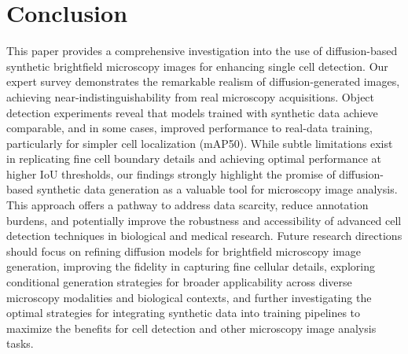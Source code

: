\section{Conclusion}
\label{sec:conclusion}
This paper provides a comprehensive investigation into the use of diffusion-based synthetic brightfield microscopy images for enhancing single cell detection.
Our expert survey demonstrates the remarkable realism of diffusion-generated images, achieving near-indistinguishability from real microscopy acquisitions.
Object detection experiments reveal that models trained with synthetic data achieve comparable, and in some cases, improved performance to real-data training, particularly for simpler cell localization (mAP\@50).
While subtle limitations exist in  replicating fine cell boundary details and achieving optimal performance at higher IoU thresholds, our findings strongly highlight the promise of diffusion-based synthetic data generation as a valuable tool for microscopy image analysis.
This approach offers a pathway to address data scarcity, reduce annotation burdens, and potentially improve the robustness and accessibility of advanced cell detection techniques in biological and medical research.
Future research directions should focus on refining diffusion models for brightfield microscopy image generation, improving the fidelity in capturing fine cellular details, exploring conditional generation strategies for broader applicability across diverse microscopy modalities and biological contexts, and further investigating the optimal strategies for integrating synthetic data into training pipelines to maximize the benefits for cell detection and other microscopy image analysis tasks.